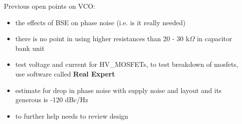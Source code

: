 Previous open points on VCO:

\begin{itemize}
	\item the effects of BSE on phase noise (i.e. is it really needed)
	\item there is no point in using higher resistances than 20 - 30 k$\Omega$ in capacitor bank unit
	\item test voltage and current for HV\_MOSFETs, to test breakdown of mosfets, use software called \textbf{Real Expert} 
	\item estimate for drop in phase noise with supply noise and layout and its generous is -120 dBc/Hz %
	\item to further help needs to review design
\end{itemize}











